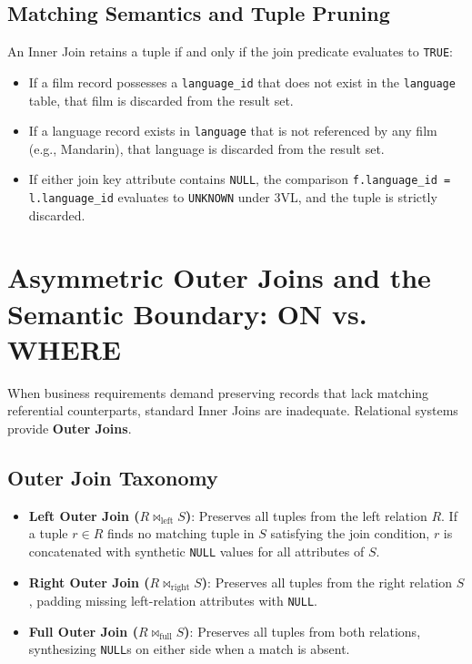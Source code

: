 \documentclass[10pt,twocolumn,letterpaper]{article}
\begin{document}
\subsection{Matching Semantics and Tuple Pruning}
An Inner Join retains a tuple if and only if the join predicate evaluates to \texttt{TRUE}:
\begin{itemize}
    \item If a film record possesses a \texttt{language\_id} that does not exist in the \texttt{language} table, that film is discarded from the result set.
    \item If a language record exists in \texttt{language} that is not referenced by any film (e.g., Mandarin), that language is discarded from the result set.
    \item If either join key attribute contains \texttt{NULL}, the comparison \texttt{f.language\_id = l.language\_id} evaluates to \texttt{UNKNOWN} under 3VL, and the tuple is strictly discarded.
\end{itemize}

\section{Asymmetric Outer Joins and the Semantic Boundary: ON vs. WHERE}
\label{sec:outer_joins}

When business requirements demand preserving records that lack matching referential counterparts, standard Inner Joins are inadequate. Relational systems provide \textbf{Outer Joins}.

\subsection{Outer Join Taxonomy}
\begin{itemize}
    \item \textbf{Left Outer Join ($R \mathbin{\bowtie_{\text{left}}} S$)}: Preserves all tuples from the left relation $R$. If a tuple $r \in R$ finds no matching tuple in $S$ satisfying the join condition, $r$ is concatenated with synthetic \texttt{NULL} values for all attributes of $S$.
    \item \textbf{Right Outer Join ($R \mathbin{\bowtie_{\text{right}}} S$)}: Preserves all tuples from the right relation $S$, padding missing left-relation attributes with \texttt{NULL}.
    \item \textbf{Full Outer Join ($R \mathbin{\bowtie_{\text{full}}} S$)}: Preserves all tuples from both relations, synthesizing \texttt{NULL}s on either side when a match is absent.
\end{itemize}
\end{document}
